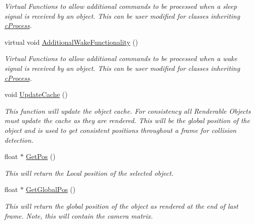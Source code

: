 \begin{DoxyCompactItemize}
\begin{DoxyCompactList}\small\item\em Virtual Functions to allow additional commands to be processed when a sleep signal is received by an object. This can be user modified for classes inheriting \hyperlink{classc_process}{cProcess}. \item\end{DoxyCompactList}\item 
virtual void \hyperlink{classc_render_object_acd23438575c9a3bcbe77e8e96c348f33}{AdditionalWakeFunctionality} ()
\begin{DoxyCompactList}\small\item\em Virtual Functions to allow additional commands to be processed when a wake signal is received by an object. This can be user modified for classes inheriting \hyperlink{classc_process}{cProcess}. \item\end{DoxyCompactList}\item 
void \hyperlink{classc_render_object_aeeb8da742f1a844179a74a99e9aa4433}{UpdateCache} ()
\begin{DoxyCompactList}\small\item\em This function will update the object cache. For consistency all Renderable Objects must update the cache as they are rendered. This will be the global position of the object and is used to get consistent positions throughout a frame for collision detection. \item\end{DoxyCompactList}\item 
float $\ast$ \hyperlink{classc_render_object_a48a88c2c6722c23ee51459e933873412}{GetPos} ()
\begin{DoxyCompactList}\small\item\em This will return the Local position of the selected object. \item\end{DoxyCompactList}\item 
float $\ast$ \hyperlink{classc_render_object_ae60403345f6e937fbb641b87afd757a9}{GetGlobalPos} ()
\begin{DoxyCompactList}\small\item\em This will return the global position of the object as rendered at the end of last frame. Note, this will contain the camera matrix. \item\end{DoxyCompactList}\end{DoxyCompactItemize}
